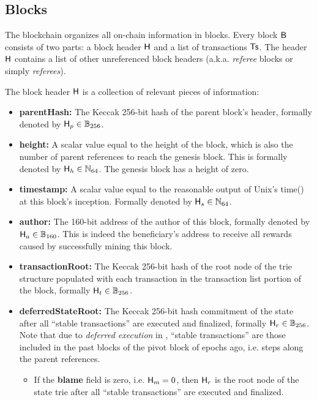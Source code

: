 \subsection{Blocks}
\label{sec:block}

The {\name} blockchain organizes all on-chain information in blocks.
%
Every {\name} block $\textsf{B}$ consists of two parts: a block header $\textsf{H}$ and a list of transactions $\textsf{Ts}$. The header $\textsf{H}$ contains a list of other unreferenced block headers (a.k.a. \emph{referee} blocks or simply \emph{referees}).

The block header $\textsf{H}$ is a collection of relevant pieces of information:
\begin{itemize}[nosep]
	\item {\bf parentHash:} The Keccak 256-bit hash of the parent block's header, formally denoted by $\textsf{H}_p\in\mathbb{B}_{256}$.
	
	\item {\bf height:} A scalar value equal to the height of the block, which is also the number of parent references to reach the genesis block. 
	This is formally denoted by $\textsf{H}_h\in \mathbb{N}_{64}$.
	The genesis block has a height of zero. 
	
	\item {\bf timestamp:} A scalar value equal to the reasonable output of Unix's time() at this block's inception. Formally denoted by $\textsf{H}_s \in \mathbb{N}_{64}$. 

	\item {\bf author:} The 160-bit address of the author of this block, formally denoted by $\textsf{H}_a \in \mathbb{B}_{160}$. 
	This is indeed the beneficiary's address to receive all rewards caused by successfully mining this block.

	\item {\bf transactionRoot:} The Keccak 256-bit hash of the root node of the trie structure populated with each transaction in the transaction list portion of the block, formally $\textsf{H}_t\in\mathbb{B}_{256}$.



	\item {\bf deferredStateRoot:} The Keccak 256-bit hash commitment of the state after all ``stable transactions''  are executed and finalized, formally $\textsf{H}_r\in\mathbb{B}_{256}$.
	Note that due to \emph{deferred execution} in {\name},  ``stable transactions'' are those included in the past blocks of the pivot block of  epochs ago, i.e.  steps along the parent references.
	\begin{itemize}
		\item If the {\bf blame} field is zero, i.e. $\textsf{H}_m=0$, then $\textsf{H}_r$ is the root node of the state trie after all ``stable transactions''  are executed and finalized.
	

\end{itemize}
\end{itemize}
